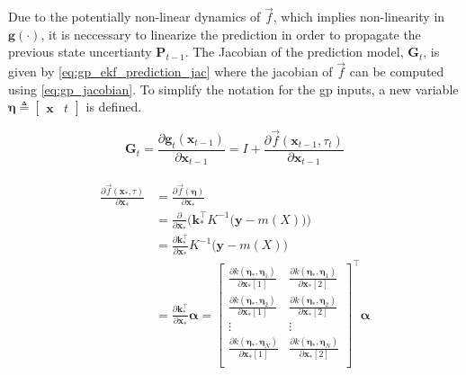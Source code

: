 Due to the potentially non-linear dynamics of $\vec{f}$, which implies non-linearity in $\boldsymbol{g}(\cdot)$, it is neccessary to linearize the prediction in order to propagate the previous state uncertianty $\boldsymbol{P}_{t-1}$. The Jacobian of the prediction model, $\boldsymbol{G}_t$, is given by \cref{eq:gp_ekf_prediction_jac} where the jacobian of $\vec{f}$ can be computed using \cref{eq:gp_jacobian}. To simplify the notation for the \acrshort{gp} inputs, a new variable $\boldsymbol{\eta} \triangleq \begin{bmatrix}
        \boldsymbol{x} & t
    \end{bmatrix}$ is defined.

\begin{equation}\label{eq:gp_ekf_prediction_jac}
    \boldsymbol{G}_t = \frac{\partial \boldsymbol{g}_t(\boldsymbol{x}_{t-1})}{\partial \boldsymbol{x}_{t-1}} = I + \frac{\partial \vec{f}(\boldsymbol{x}_{t-1}, \tau_t)}{\partial \boldsymbol{x}_{t-1}}
\end{equation}

\begin{align}\label{eq:gp_jacobian}
    \begin{split}
        \frac{\partial \vec{f}(\boldsymbol{x}_*, \tau)}{\partial \boldsymbol{x}_*} &= \frac{\partial \vec{f}(\boldsymbol{\eta})}{\partial \boldsymbol{x}_*} \\  &= \frac{\partial}{\partial \boldsymbol{x}_*} \bigg(\boldsymbol{k}_*^\intercal K^{-1} \big(\boldsymbol{y} - m(X)\big)\bigg)\\
        &= \frac{\partial \boldsymbol{k}_*^\intercal}{\partial \boldsymbol{x}_*} K^{-1} \big(\boldsymbol{y} - m(X)\big)\\
        &= \frac{\partial \boldsymbol{k}_*^\intercal}{\partial \boldsymbol{x}_*} \boldsymbol{\alpha} = \begin{bmatrix}
            \frac{\partial k(\boldsymbol{\eta}_*, \boldsymbol{\eta}_1)}{\partial \boldsymbol{x}_*[1]} & \frac{\partial k(\boldsymbol{\eta}_*, \boldsymbol{\eta}_1)}{\partial \boldsymbol{x}_*[2]} \\
            \frac{\partial k(\boldsymbol{\eta}_*, \boldsymbol{\eta}_2)}{\partial \boldsymbol{x}_*[1]} & \frac{\partial k(\boldsymbol{\eta}_*, \boldsymbol{\eta}_2)}{\partial \boldsymbol{x}_*[2]} \\
            \vdots                                                                                    & \vdots                                                                                    \\
            \frac{\partial k(\boldsymbol{\eta}_*, \boldsymbol{\eta}_N)}{\partial \boldsymbol{x}_*[1]} & \frac{\partial k(\boldsymbol{\eta}_*, \boldsymbol{\eta}_N)}{\partial \boldsymbol{x}_*[2]} \\
        \end{bmatrix}^\intercal \boldsymbol{\alpha}
    \end{split}
\end{align}

